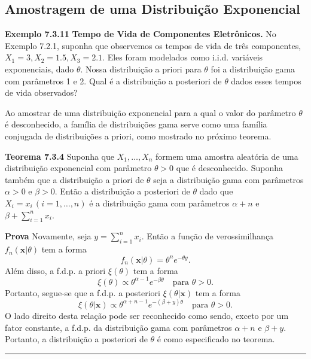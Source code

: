 \vspace{1cm}
\vspace{1cm}

\subsection*{Amostragem de uma Distribuição Exponencial}

\noindent\textbf{Exemplo 7.3.11} \quad \textbf{Tempo de Vida de Componentes Eletrônicos.} No Exemplo 7.2.1, suponha que observemos os tempos de vida de três componentes, $X_1=3, X_2=1.5, X_3=2.1$. Eles foram modelados como i.i.d. variáveis exponenciais, dado $\theta$. Nossa distribuição a priori para $\theta$ foi a distribuição gama com parâmetros 1 e 2. Qual é a distribuição a posteriori de $\theta$ dados esses tempos de vida observados?

\vspace{1cm}
Ao amostrar de uma distribuição exponencial para a qual o valor do parâmetro $\theta$ é desconhecido, a família de distribuições gama serve como uma família conjugada de distribuições a priori, como mostrado no próximo teorema.

\vspace{1cm}
\noindent\textbf{Teorema 7.3.4} \quad Suponha que $X_1, \dots, X_n$ formem uma amostra aleatória de uma distribuição exponencial com parâmetro $\theta>0$ que é desconhecido. Suponha também que a distribuição a priori de $\theta$ seja a distribuição gama com parâmetros $\alpha>0$ e $\beta>0$. Então a distribuição a posteriori de $\theta$ dado que $X_i=x_i \, (i=1, \dots, n)$ é a distribuição gama com parâmetros $\alpha+n$ e $\beta+\sum_{i=1}^{n}x_i$.

\vspace{1cm}
\noindent\textbf{Prova} \quad Novamente, seja $y=\sum_{i=1}^{n}x_i$. Então a função de verossimilhança $f_n(\mathbf{x}|\theta)$ tem a forma
$$ f_n(\mathbf{x}|\theta) = \theta^n e^{-\theta y}. $$
Além disso, a f.d.p. a priori $\xi(\theta)$ tem a forma
$$ \xi(\theta) \propto \theta^{\alpha-1}e^{-\beta\theta} \quad \text{para } \theta>0. $$
Portanto, segue-se que a f.d.p. a posteriori $\xi(\theta|\mathbf{x})$ tem a forma
$$ \xi(\theta|\mathbf{x}) \propto \theta^{\alpha+n-1}e^{-(\beta+y)\theta} \quad \text{para } \theta>0. $$
O lado direito desta relação pode ser reconhecido como sendo, exceto por um fator constante, a f.d.p. da distribuição gama com parâmetros $\alpha+n$ e $\beta+y$. Portanto, a distribuição a posteriori de $\theta$ é como especificado no teorema. \rule{0.5em}{0.5em}

